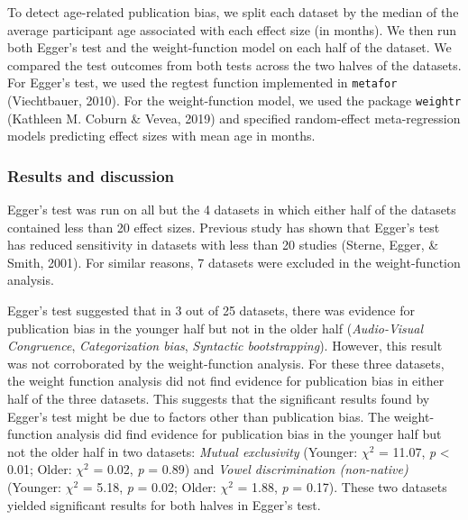 \documentclass[
  man]{apa6}
\begin{document}
To detect age-related publication bias, we split each dataset by the median of the average participant age associated with each effect size (in months). We then run both Egger's test and the weight-function model on each half of the dataset. We compared the test outcomes from both tests across the two halves of the datasets. For Egger's test, we used the regtest function implemented in \texttt{metafor} (Viechtbauer, 2010). For the weight-function model, we used the package \texttt{weightr} (Kathleen M. Coburn \& Vevea, 2019) and specified random-effect meta-regression models predicting effect sizes with mean age in months.

\hypertarget{results-and-discussion}{%
\subsubsection{Results and discussion}\label{results-and-discussion}}

Egger's test was run on all but the 4 datasets in which either half of the datasets contained less than 20 effect sizes. Previous study has shown that Egger's test has reduced sensitivity in datasets with less than 20 studies (Sterne, Egger, \& Smith, 2001). For similar reasons, 7 datasets were excluded in the weight-function analysis.

Egger's test suggested that in 3 out of 25 datasets, there was evidence for publication bias in the younger half but not in the older half (\emph{Audio-Visual Congruence}, \emph{Categorization bias}, \emph{Syntactic bootstrapping}). However, this result was not corroborated by the weight-function analysis. For these three datasets, the weight function analysis did not find evidence for publication bias in either half of the three datasets. This suggests that the significant results found by Egger's test might be due to factors other than publication bias. The weight-function analysis did find evidence for publication bias in the younger half but not the older half in two datasets: \emph{Mutual exclusivity} (Younger: \(\chi^2\) = 11.07, \emph{p} \textless{} 0.01; Older: \(\chi^2\) = 0.02, \emph{p} = 0.89) and \emph{Vowel discrimination (non-native)} (Younger: \(\chi^2\) = 5.18, \emph{p} = 0.02; Older: \(\chi^2\) = 1.88, \emph{p} = 0.17). These two datasets yielded significant results for both halves in Egger's test.
\end{document}
